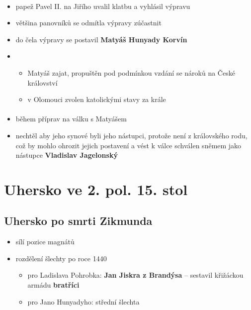 \paragraph{}
\begin{itemize}
\item papež Pavel II. na Jiřího uvalil klatbu a vyhlásil výpravu
\item většina panovníků se odmítla výpravy zúčastnit
\item do čela výpravy se postavil \textbf{Matyáš Hunyady Korvín}
\item {} 
	\begin{itemize}
	\item Matyáš zajat, propuštěn pod podmínkou vzdání se nároků na České království
	\item v Olomouci zvolen katolickými stavy za krále 
	\end{itemize}
\end{itemize}

\paragraph{}
\begin{itemize}
\item během příprav na válku s Matyášem
\item nechtěl aby jeho synové byli jeho nástupci, protože není z královského rodu, což by mohlo ohrozit jejich postavení a vést k válce  schválen sněmem jako nástupce \textbf{Vladislav Jagelonský}
\end{itemize}



\section{Uhersko ve 2. pol. 15. stol}
\subsection{Uhersko po smrti Zikmunda}
\begin{itemize}
\item sílí pozice magnátů
\item rozdělení šlechty po roce 1440
	\begin{itemize}
	\item pro Ladislava Pohrobka: \textbf{Jan Jiskra z Brandýsa} -- sestavil křižáckou armádu \textbf{bratříci}
	\item pro Jano Hunyadyho: střední šlechta
	\end{itemize}
\end{itemize}

